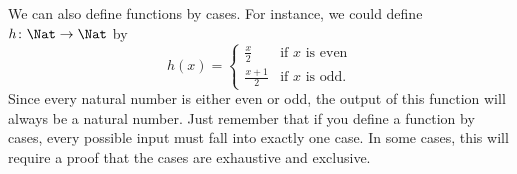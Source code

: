 \documentclass[../../../include/open-logic-section]{subfiles}
\begin{document}
\begin{ex}
We can also define functions by cases. For instance, we could define
$h \colon \Nat \to \Nat$  by
\[
h(x) =
\begin{cases}
  \frac{x}{2} & \text{if $x$ is even} \\
  \frac{x+1}{2} & \text{if $x$ is odd.}
\end{cases}
\]
Since every natural number is either even or odd, the output of this
function will always be a natural number. Just remember that if you
define a function by cases, every possible input must fall into
exactly one case.  In some cases, this will require a proof that the
cases are exhaustive and exclusive.
\end{ex}
\end{document}
